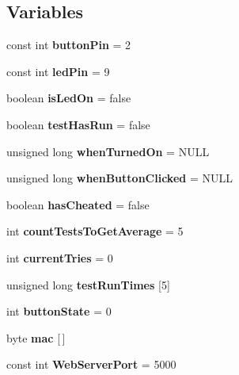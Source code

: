 \subsection*{Variables}
\begin{DoxyCompactItemize}
\item 
\mbox{\label{test_8ino_a4ddb8b6ae564eb22f7c74f2683a63b8e}} 
const int {\bfseries button\+Pin} = 2
\item 
\mbox{\label{test_8ino_a2cd9f0d96c9cd0637798de3baa7aee60}} 
const int {\bfseries led\+Pin} = 9
\item 
\mbox{\label{test_8ino_aee47635c78d9c5f0aa27183bfa35d819}} 
boolean {\bfseries is\+Led\+On} = false
\item 
\mbox{\label{test_8ino_a9c86e8e71b0cc50fc8b7362cf5dfe382}} 
boolean {\bfseries test\+Has\+Run} = false
\item 
\mbox{\label{test_8ino_ab7291a0ad43230de4527fd9a0884a286}} 
unsigned long {\bfseries when\+Turned\+On} = N\+U\+LL
\item 
\mbox{\label{test_8ino_afe4223fc496cda29c29b82bbb8f09b48}} 
unsigned long {\bfseries when\+Button\+Clicked} = N\+U\+LL
\item 
\mbox{\label{test_8ino_a67def723225fceb32a57f7024f7588e8}} 
boolean {\bfseries has\+Cheated} = false
\item 
\mbox{\label{test_8ino_a24ea86697f33c3769f06300cc30b6cf3}} 
int {\bfseries count\+Tests\+To\+Get\+Average} = 5
\item 
\mbox{\label{test_8ino_ac90ba0cf53c85fd16b8d95d1f0f9c298}} 
int {\bfseries current\+Tries} = 0
\item 
\mbox{\label{test_8ino_ac462bdb2739adfafcdc80951a7ca009a}} 
unsigned long {\bfseries test\+Run\+Times} \mbox{[}5\mbox{]}
\item 
\mbox{\label{test_8ino_a5002611f83f5a861df12917dd5651db8}} 
int {\bfseries button\+State} = 0
\item 
byte {\bfseries mac} \mbox{[}$\,$\mbox{]}
\item 
\mbox{\label{test_8ino_af37b150d7960fc164e55cf58aade65a3}} 
const int {\bfseries Web\+Server\+Port} = 5000
\end{DoxyCompactItemize}



